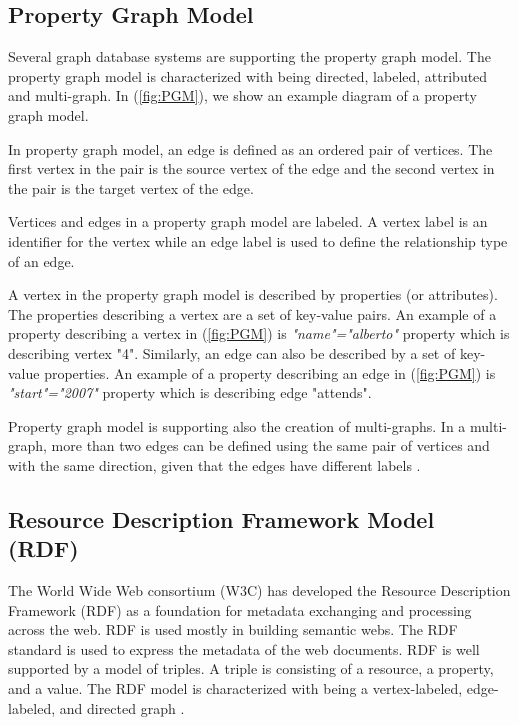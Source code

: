 {\subsection{Property Graph Model}
\label{subsec:PGM}

Several graph database systems are supporting the property graph model. The property graph model is characterized with being directed, labeled, attributed and multi-graph. In (\ref{fig:PGM}), we show an example diagram of a property graph model. 

In property graph model, an edge is defined as an ordered pair of vertices. The first vertex in the pair is the source vertex of the edge and the second vertex in the pair is the target vertex of the edge. 

Vertices and edges in a property graph model are labeled. A vertex label is an identifier for the vertex while an edge label is used to define the relationship type of an edge. 

A vertex in the property graph model is described by properties (or attributes). The properties describing a vertex are a set of key-value pairs. An example of a property describing a vertex in (\ref{fig:PGM}) is \textit{"name"="alberto"} property which is describing vertex "4". Similarly, an edge can also be described by a set of key-value properties. An example of a property describing an edge in (\ref{fig:PGM}) is \textit{"start"="2007"} property which is describing edge "attends".

Property graph model is supporting also the creation of multi-graphs. In a multi-graph, more than two edges can be defined using the same pair of vertices and with the same direction, given that the edges have different labels \cite{DBLP:journals/corr/abs-1006-2361, Robinson:2015:GDN:2846367}.



\subsection{Resource Description Framework Model (RDF)}
\label{subsec:RDF}

The World Wide Web consortium (W3C) has developed the Resource Description Framework (RDF) as a foundation for metadata exchanging and processing across the web. RDF is used mostly in building semantic webs. The RDF standard is used to express the metadata of the web documents. RDF is well supported by a model of triples. A triple is consisting of a resource, a property, and a value. The RDF model is characterized with being a vertex-labeled, edge-labeled, and directed graph \cite{ngomo2014introduction}.

}
